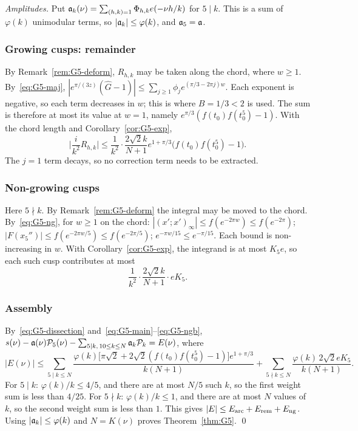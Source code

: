 \emph{Amplitudes.} Put $\mathfrak a_k(\nu)=\sum_{(h,k)=1}\Phi_{h,k}e(-\nu h/k)$ for $5\mid k$. This is a sum of $\varphi(k)$
unimodular terms, so $|\mathfrak a_k|\le\varphi(k)$, and $\mathfrak a_5=\mathfrak a$.

\subsubsection{Growing cusps: remainder}\label{sec:G5-rem}
By Remark~\ref{rem:G5-deform}, $R_{h,k}$ may be taken along the chord, where $w\ge1$. By~\eqref{eq:G5-maj},
$|e^{\pi/(3z)}(\hat G-1)|\le\sum_{j\ge1}\phi_je^{(\pi/3-2\pi j)w}$. Each exponent is negative, so each term decreases in
$w$; this is where $B=1/3<2$ is used. The sum is therefore at most its value at $w=1$, namely
$e^{\pi/3}(f(t_0)f(t_0^5)-1)$. With the chord length and Corollary~\ref{cor:G5-exp},
\begin{equation}\label{eq:G5-rem}
\Big|\frac i{k^2}R_{h,k}\Big|\le\frac1{k^2}\cdot\frac{2\sqrt2k}{N+1}e^{1+\pi/3}\big(f(t_0)f(t_0^5)-1\big).
\end{equation}
The $j=1$ term decays, so no correction term needs to be extracted.

\subsubsection{Non-growing cusps}\label{sec:G5-ng}
Here $5\nmid k$. By Remark~\ref{rem:G5-deform} the integral may be moved to the chord. By~\eqref{eq:G5-ng}, for $w\ge1$ on
the chord: $|(x';x')_\infty|\le f(e^{-2\pi w})\le f(e^{-2\pi})$; $|F(x_5'')|\le f(e^{-2\pi w/5})\le f(e^{-2\pi/5})$;
$e^{-\pi w/15}\le e^{-\pi/15}$. Each bound is non-increasing in $w$. With Corollary~\ref{cor:G5-exp}, the integrand is at
most $K_5e$, so each such cusp contributes at most
\begin{equation}\label{eq:G5-ngb}
\frac1{k^2}\cdot\frac{2\sqrt2k}{N+1}\cdot eK_5 .
\end{equation}

\subsubsection{Assembly}
By~\eqref{eq:G5-dissection} and~\eqref{eq:G5-main}--\eqref{eq:G5-ngb},
$s(\nu)-\mathfrak a(\nu)\mathcal P_5(\nu)-\sum_{5\mid k,\,10\le k\le N}\mathfrak a_k\mathcal P_k=E(\nu)$, where
\[
|E(\nu)|\le\sum_{5\mid k\le N}\frac{\varphi(k)\big[\pi\sqrt2+2\sqrt2(f(t_0)f(t_0^5)-1)\big]e^{1+\pi/3}}{k(N+1)}
+\sum_{5\nmid k\le N}\frac{\varphi(k)\,2\sqrt2eK_5}{k(N+1)}.
\]
For $5\mid k$: $\varphi(k)/k\le4/5$, and there are at most $N/5$ such $k$, so the first weight sum is less than $4/25$. For
$5\nmid k$: $\varphi(k)/k\le1$, and there are at most $N$ values of $k$, so the second weight sum is less than $1$. This
gives $|E|\le E_{\rm arc}+E_{\rm rem}+E_{\rm ng}$. Using $|\mathfrak a_k|\le\varphi(k)$ and $N=K(\nu)$ proves
Theorem~\ref{thm:G5}. \qed

